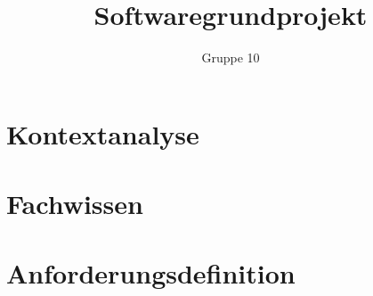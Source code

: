 \documentclass[DIN, pagenumber=false, fontsize=11pt, parskip=half]{scrartcl}
\title{Softwaregrundprojekt}
\author{Gruppe 10}
\begin{document}
    \maketitle
    \section{Kontextanalyse}
    \section{Fachwissen}
    
    
    \section{Anforderungsdefinition}
\end{document}
